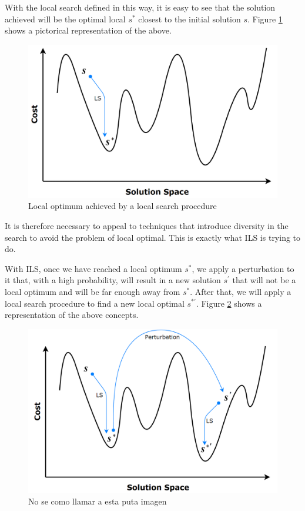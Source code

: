 \documentclass[review]{elsarticle}
\begin{document}
With the local search defined in this way, it is easy to see that the solution achieved will be the optimal local $s^*$ closest to the initial solution $s$. Figure \ref{img:LS} shows a pictorical representation of the above.

\begin{figure}[!h]
	\centering
	\includegraphics[scale=0.25]{Figures/LS.png}
	\caption{Local optimum achieved by a local search procedure}\label{img:LS}
\end{figure}

It is therefore necessary to appeal to techniques that introduce diversity in the search to avoid the problem of local optimal. This is exactly what ILS is trying to do.

With ILS, once we have reached a local optimum $s^*$, we apply a perturbation to it that, with a high probability, will result in a new solution $s^\prime$ that will not be a local optimum and will be far enough away from $s^*$. After that, we will apply a local search procedure to find a new local optimal $s^{*\prime}$. Figure \ref{img:ILS} shows a representation of the above concepts.

\begin{figure}[!h]
	\centering
	\includegraphics[scale=0.25]{Figures/ILS.png}
	\caption{No se como llamar a esta puta imagen}\label{img:ILS}
\end{figure}
\end{document}
